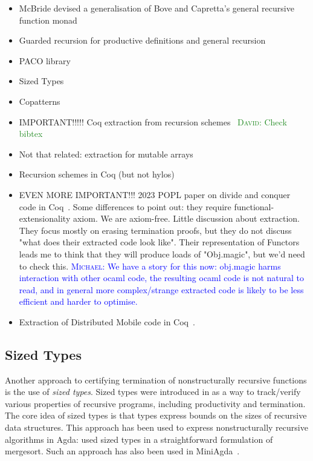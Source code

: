 \documentclass[a4paper, UKenglish, cleveref, autoref, thm-restate]{lipics-v2021}
\newcommand{\dcas}[1]{\textcolor{ForestGreen}{\textsc{David}: #1}}
\newcommand{\mvol}[1]{\textcolor{blue}{\textsc{Michael}: #1}}
\begin{document}
\begin{itemize}
  \item McBride devised a generalisation of Bove and Capretta's general
recursive function monad~\cite{McBride15, BoveC01}
  \item Guarded recursion for productive definitions and general recursion
~\cite{AtkeyM13, PaviottiMB15}
  \item PACO library~\cite{HurNDV13}
  \item Sized Types \cite{HughesPS96, abs-1202-3496}
  \item Copatterns \cite{AbelPTS13, AbelP16}
  \item IMPORTANT!!!!! Coq extraction from recursion
    schemes~\cite{larchey2022braga} \dcas{Check bibtex}
  \item Not that related: extraction for mutable arrays~\cite{SAKAGUCHI2020102372}
  \item Recursion schemes in Coq (but not hylos)~\cite{MurataE19}
  \item EVEN MORE IMPORTANT!!! 2023 POPL paper on divide and conquer code in
    Coq~\cite{AbreuDHJMS23}.  Some differences to point out: they require
    functional-extensionality axiom. We are axiom-free. Little discussion about
    extraction. They focus mostly on erasing termination proofs, but they do
    not discuss "what does their extracted code look like". Their
    representation of Functors leads me to think that they will produce loads
        of "Obj.magic", but we'd need to check this. \mvol{We have a story for this now: obj.magic harms interaction with other ocaml code, the resulting ocaml code is not natural to read, and in general more complex/strange extracted code is likely to be less efficient and harder to optimise.}
        \item Extraction of Distributed Mobile code in Coq~\cite{MiculanP12}.
\end{itemize}

\subsection{Sized Types}

Another approach to certifying termination of nonstructurally recursive
functions is the use of \emph{sized types}. Sized types were introduced in
\cite{HughesPS96} as a way to track/verify various properties of recursive
programs, including productivity and termination. The core idea of sized types
is that types express bounds on the sizes of recursive data structures. This
approach has been used to express nonstructurally recursive algorithms in Agda:
\cite{CopelloTB14} used sized types in a straightforward formulation of
mergesort. Such an approach has also been used in MiniAgda~\cite{abs-1202-3496}.
\end{document}
